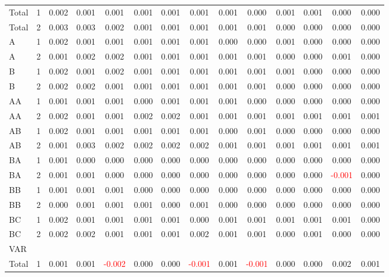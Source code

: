 \begin{table}[H]
{\begin{tabular}{llcccccccccccc}
\hline
Total & 1 & 0.002 & 0.001 & 0.001 & 0.001 & 0.001 & 0.001 & 0.001 & 0.000 & 0.001 & 0.001 & 0.000 & 0.000\\
Total & 2 & 0.003 & 0.003 & 0.002 & 0.001 & 0.001 & 0.001 & 0.001 & 0.001 & 0.000 & 0.000 & 0.000 & 0.000\\
A & 1 & 0.002 & 0.001 & 0.001 & 0.001 & 0.001 & 0.001 & 0.000 & 0.000 & 0.001 & 0.000 & 0.000 & 0.000\\
A & 2 & 0.001 & 0.002 & 0.002 & 0.001 & 0.001 & 0.001 & 0.001 & 0.001 & 0.000 & 0.000 & 0.001 & 0.000\\
B & 1 & 0.002 & 0.001 & 0.002 & 0.001 & 0.001 & 0.001 & 0.001 & 0.001 & 0.001 & 0.000 & 0.000 & 0.000\\
B & 2 & 0.002 & 0.002 & 0.001 & 0.001 & 0.001 & 0.001 & 0.001 & 0.001 & 0.000 & 0.000 & 0.000 & 0.000\\
AA & 1 & 0.001 & 0.001 & 0.001 & 0.000 & 0.001 & 0.001 & 0.001 & 0.000 & 0.000 & 0.000 & 0.000 & 0.000\\
AA & 2 & 0.002 & 0.001 & 0.001 & 0.002 & 0.002 & 0.001 & 0.001 & 0.001 & 0.001 & 0.001 & 0.001 & 0.001\\
AB & 1 & 0.002 & 0.001 & 0.001 & 0.001 & 0.001 & 0.001 & 0.000 & 0.001 & 0.000 & 0.000 & 0.000 & 0.000\\
AB & 2 & 0.001 & 0.003 & 0.002 & 0.002 & 0.002 & 0.002 & 0.001 & 0.001 & 0.001 & 0.001 & 0.001 & 0.001\\
BA & 1 & 0.001 & 0.000 & 0.000 & 0.000 & 0.000 & 0.000 & 0.000 & 0.000 & 0.000 & 0.000 & 0.000 & 0.000\\
BA & 2 & 0.001 & 0.001 & 0.000 & 0.000 & 0.000 & 0.000 & 0.000 & 0.000 & 0.000 & 0.000 & \textcolor{red}{-0.001} & 0.000\\
BB & 1 & 0.001 & 0.001 & 0.001 & 0.000 & 0.000 & 0.000 & 0.000 & 0.000 & 0.000 & 0.000 & 0.000 & 0.000\\
BB & 2 & 0.000 & 0.001 & 0.001 & 0.001 & 0.000 & 0.001 & 0.000 & 0.000 & 0.000 & 0.000 & 0.000 & 0.000\\
BC & 1 & 0.002 & 0.001 & 0.001 & 0.001 & 0.001 & 0.000 & 0.001 & 0.001 & 0.001 & 0.001 & 0.001 & 0.000\\
BC & 2 & 0.002 & 0.002 & 0.001 & 0.001 & 0.001 & 0.002 & 0.001 & 0.001 & 0.000 & 0.001 & 0.000 & 0.000\\
\hline
VAR &  &  &  &  &  &  &  &  &  &  &  &  & \\
\hline
Total & 1 & 0.001 & 0.001 & \textcolor{red}{-0.002} & 0.000 & 0.000 & \textcolor{red}{-0.001} & 0.001 & \textcolor{red}{-0.001} & 0.000 & 0.000 & 0.002 & 0.001\\

\end{tabular}}
\end{table}
